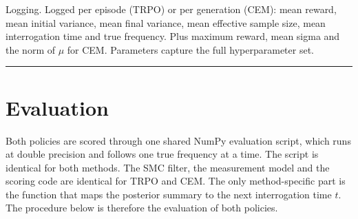 \documentclass[12pt,a4paper]{article}
\begin{document}
Logging. Logged per episode (TRPO) or per generation (CEM): mean reward, mean initial variance, mean
final variance, mean effective sample size, mean interrogation time and true frequency. Plus maximum
reward, mean sigma and the norm of $\mu$ for CEM. Parameters capture the full hyperparameter set.

\noindent\rule{\textwidth}{0.4pt}
\FloatBarrier

\section{Evaluation}
\label{sec:evaluation}
Both policies are scored through one shared NumPy evaluation script, which runs at double precision
and follows one true frequency at a time. The script is identical for both methods. The SMC filter, the
measurement model and the scoring code are identical for TRPO and CEM. The only method-specific part
is the function that maps the posterior summary to the next interrogation time $t$. The procedure
below is therefore the evaluation of both policies.
\end{document}
